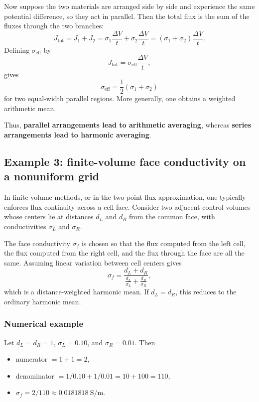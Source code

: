 \documentclass[a4paper,10pt]{article}
\begin{document}
Now suppose the two materials are arranged side by side and experience the same potential difference, so they act in parallel. Then the total flux is the sum of the fluxes through the two branches:
\begin{equation}
J_{\mathrm{tot}} = J_1 + J_2
= \sigma_1\frac{\Delta V}{t} + \sigma_2\frac{\Delta V}{t}
= (\sigma_1+\sigma_2)\frac{\Delta V}{t}.
\end{equation}
Defining $\sigma_{\mathrm{eff}}$ by
\[
J_{\mathrm{tot}} = \sigma_{\mathrm{eff}}\frac{\Delta V}{t},
\]
gives
\begin{equation}
\sigma_{\mathrm{eff}} = \frac{1}{2}(\sigma_1+\sigma_2)
\end{equation}
for two equal-width parallel regions. More generally, one obtains a weighted arithmetic mean.

Thus, \textbf{parallel arrangements lead to arithmetic averaging}, whereas \textbf{series arrangements lead to harmonic averaging}.

\subsection{Example 3: finite-volume face conductivity on a nonuniform grid}

In finite-volume methods, or in the two-point flux approximation, one typically enforces flux continuity across a cell face. Consider two adjacent control volumes whose centers lie at distances $d_L$ and $d_R$ from the common face, with conductivities $\sigma_L$ and $\sigma_R$.

The face conductivity $\sigma_f$ is chosen so that the flux computed from the left cell, the flux computed from the right cell, and the flux through the face are all the same. Assuming linear variation between cell centers gives
\begin{equation}
\sigma_f = \frac{d_L+d_R}{\frac{d_L}{\sigma_L}+\frac{d_R}{\sigma_R}},
\end{equation}
which is a distance-weighted harmonic mean. If $d_L=d_R$, this reduces to the ordinary harmonic mean.

\subsubsection{Numerical example}

Let $d_L=d_R=1$, $\sigma_L=0.10$, and $\sigma_R=0.01$. Then
\begin{itemize}
\item numerator $=1+1=2$,
\item denominator $=1/0.10 + 1/0.01 = 10 + 100 = 110$,
\item $\sigma_f = 2/110 \approx 0.0181818\ \text{S/m}$.
\end{itemize}
\end{document}
